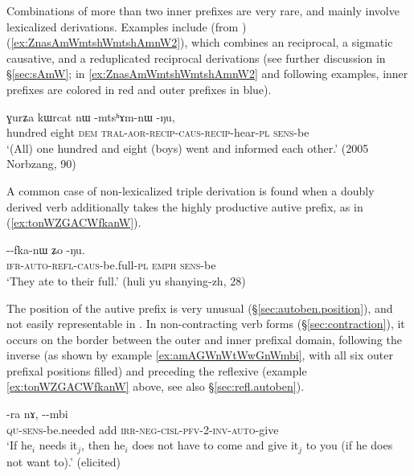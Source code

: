 Combinations of more than two inner prefixes are very rare, and mainly involve lexicalized derivations. Examples include (from ) (\ref{ex:ZnasAmWmtshWmtshAmnW2}), which combines an reciprocal, a sigmatic causative, and a reduplicated reciprocal derivations (see further discussion in §\ref{sec:sAmW}; in \ref{ex:ZnasAmWmtshWmtshAmnW2} and following examples, inner prefixes are colored in red and outer prefixes in blue).

\begin{exe}
\ex \label{ex:ZnasAmWmtshWmtshAmnW2}
\gll  ɣurʑa kɯrcat nɯ -mtsʰɤm-nɯ -ŋu, \\
 hundred eight \textsc{dem} \textsc{tral}-\textsc{aor}-\textsc{recip}-\textsc{caus}-\textsc{recip}-hear-\textsc{pl} \textsc{sens}-be \\
\glt `(All) one hundred and eight (boys) went and informed each other.' (2005 Norbzang, 90)
\end{exe}

 A common case of non-lexicalized triple derivation is found when a doubly derived verb additionally takes the highly productive autive prefix, as in (\ref{ex:tonWZGACWfkanW}).


\begin{exe}
\ex \label{ex:tonWZGACWfkanW}
\gll   {}--fka-nɯ ʑo -ŋu. \\
  \textsc{ifr}-\textsc{auto}-\textsc{refl}-\textsc{caus}-be.full-\textsc{pl} \textsc{emph} \textsc{sens}-be \\
\glt `They ate to their full.' (huli yu shanying-zh, 28)
\end{exe}

The position of the autive prefix is very unusual (§\ref{sec:autoben.position}), and not easily representable in . In non-contracting verb forms (§\ref{sec:contraction}), it occurs on the border between the outer and inner prefixal domain, following the inverse (as shown by example \ref{ex:amAGWnWtWwGnWmbi}, with all six outer prefixal positions filled) and preceding the reflexive  (example \ref{ex:tonWZGACWfkanW} above, see also §\ref{sec:refl.autoben}). 

\begin{exe}
\ex \label{ex:amAGWnWtWwGnWmbi}
\gll {}-ra nɤ, --mbi \\
\textsc{qu}-\textsc{sens}-be.needed add \textsc{irr}-\textsc{neg}-\textsc{cisl}-\textsc{pfv}-2-\textsc{inv}-\textsc{auto}-give \\
\glt `If he$_i$ needs it$_j$, then he$_i$ does not have to come and give it$_j$ to you (if he does not want to).' (elicited) 
\end{exe}


